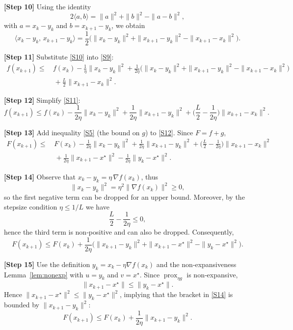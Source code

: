 \documentclass{article}
\newcommand{\prox}{\operatorname{prox}}
\newcommand{\grad}{\nabla}
\begin{document}
\noindent\textbf{[Step 10]} Using the identity
\[
2\langle a,b\rangle = \|a\|^{2}+\|b\|^{2}-\|a-b\|^{2},
\]
with $a=x_{k}-y_{k}$ and $b=x_{k+1}-y_{k}$, we obtain
\[
\langle x_{k}-y_{k},\,x_{k+1}-y_{k}\rangle
=\frac12\Big(\|x_{k}-y_{k}\|^{2}+\|x_{k+1}-y_{k}\|^{2}-\|x_{k+1}-x_{k}\|^{2}\Big).
\tag{S10}
\]

\noindent\textbf{[Step 11]} Substitute \eqref{S10} into \eqref{S9}:
\[
\begin{aligned}
f(x_{k+1})\le &\, f(x_{k})
-\frac{1}{\eta}\|x_{k}-y_{k}\|^{2}
+\frac{1}{2\eta}\Big(\|x_{k}-y_{k}\|^{2}+\|x_{k+1}-y_{k}\|^{2}-\|x_{k+1}-x_{k}\|^{2}\Big)\\
&\;+\frac{L}{2}\|x_{k+1}-x_{k}\|^{2}.
\end{aligned}
\tag{S11}
\]

\noindent\textbf{[Step 12]} Simplify \eqref{S11}:
\[
f(x_{k+1})\le f(x_{k})-\frac{1}{2\eta}\|x_{k}-y_{k}\|^{2}
+\frac{1}{2\eta}\|x_{k+1}-y_{k}\|^{2}
+\Big(\frac{L}{2}-\frac{1}{2\eta}\Big)\|x_{k+1}-x_{k}\|^{2}.
\tag{S12}
\]

\noindent\textbf{[Step 13]} Add inequality \eqref{S5} (the bound on $g$) to \eqref{S12}. Since $F=f+g$,
\[
\begin{aligned}
F(x_{k+1})\le &\, F(x_{k})
-\frac{1}{2\eta}\|x_{k}-y_{k}\|^{2}
+\frac{1}{2\eta}\|x_{k+1}-y_{k}\|^{2}
+\Big(\frac{L}{2}-\frac{1}{2\eta}\Big)\|x_{k+1}-x_{k}\|^{2}\\
&\;+\frac{1}{2\eta}\|x_{k+1}-x^{\star}\|^{2}
-\frac{1}{2\eta}\|y_{k}-x^{\star}\|^{2}.
\end{aligned}
\tag{S13}
\]

\noindent\textbf{[Step 14]} Observe that $x_{k}-y_{k}= \eta\,\grad f(x_{k})$, thus
\[
\|x_{k}-y_{k}\|^{2}= \eta^{2}\|\grad f(x_{k})\|^{2}\ge 0,
\]
so the first negative term can be dropped for an upper bound. Moreover, by the stepsize condition $\eta\le 1/L$ we have
\[
\frac{L}{2}-\frac{1}{2\eta}\le 0,
\]
hence the third term is non‑positive and can also be dropped. Consequently,
\[
F(x_{k+1})\le F(x_{k})+\frac{1}{2\eta}\Big(\|x_{k+1}-y_{k}\|^{2}+\|x_{k+1}-x^{\star}\|^{2}-\|y_{k}-x^{\star}\|^{2}\Big).
\tag{S14}
\]

\noindent\textbf{[Step 15]} Use the definition $y_{k}=x_{k}-\eta\grad f(x_{k})$ and the non‑expansiveness Lemma~\ref{lem:nonexp} with $u=y_{k}$ and $v=x^{\star}$. Since $\prox_{\eta g}$ is non‑expansive,
\[
\|x_{k+1}-x^{\star}\| \le \|y_{k}-x^{\star}\|.
\tag{S15}
\]
Hence $\|x_{k+1}-x^{\star}\|^{2}\le\|y_{k}-x^{\star}\|^{2}$, implying that the bracket in \eqref{S14} is bounded by $\|x_{k+1}-y_{k}\|^{2}$:
\[
F(x_{k+1})\le F(x_{k})+\frac{1}{2\eta}\|x_{k+1}-y_{k}\|^{2}.
\tag{S16}
\]
\end{document}
